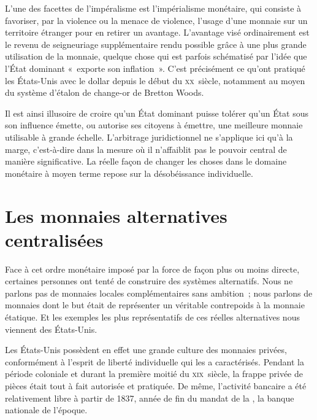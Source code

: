 L'une des facettes de l'impéralisme est l'impérialisme monétaire, qui consiste à favoriser, par la violence ou la menace de violence, l'usage d'une monnaie sur un territoire étranger pour en retirer un avantage. L'avantage visé ordinairement est le revenu de seigneuriage supplémentaire rendu possible grâce à une plus grande utilisation de la monnaie, quelque chose qui est parfois schématisé par l'idée que l'État dominant «~exporte son inflation~». C'est précisément ce qu'ont pratiqué les États-Unis avec le dollar depuis le début du \textsc{xx}\ieme{}~siècle, notamment au moyen du système d'étalon de change-or de Bretton Woods. %

Il est ainsi illusoire de croire qu'un État dominant puisse tolérer qu'un État sous son influence émette, ou autorise ses citoyens à émettre, une meilleure monnaie utilisable à grande échelle. L'arbitrage juridictionnel ne s'applique ici qu'à la marge, c'est-à-dire dans la mesure où il n'affaiblit pas le pouvoir central de manière significative. La réelle façon de changer les choses dans le domaine monétaire à moyen terme repose sur la désobéissance individuelle.

\section*{Les monnaies alternatives centralisées}

Face à cet ordre monétaire imposé par la force de façon plus ou moins directe, certaines personnes ont tenté de construire des systèmes alternatifs. Nous ne parlons pas de monnaies locales complémentaires sans ambition~; nous parlons de monnaies dont le but était de représenter un véritable contrepoids à la monnaie étatique. Et les exemples les plus représentatifs de ces réelles alternatives nous viennent des États-Unis.

Les États-Unis possèdent en effet une grande culture des monnaies privées, conformément à l'esprit de liberté individuelle qui les a caractérisés. Pendant la période coloniale et durant la première moitié du \textsc{xix}\ieme{}~siècle, la frappe privée de pièces était tout à fait autorisée et pratiquée. De même, l'activité bancaire a été relativement libre à partir de 1837, année de fin du mandat de la , la banque nationale de l'époque.

